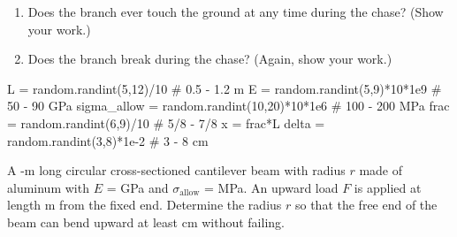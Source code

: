 \documentclass[
10pt,
a4paper,
openany,
svgnames,
]{kaobook} %
\begin{document}
\begin{exercises}
\begin{enumerate}
\item Does the branch ever touch the ground at any time during the chase? (Show your work.)
\item Does the branch break during the chase? (Again, show your work.)
\end{enumerate}

\begin{pycode}
  L = random.randint(5,12)/10 # 0.5 - 1.2 m
  E = random.randint(5,9)*10*1e9 # 50 - 90 GPa
  sigma_allow = random.randint(10,20)*10*1e6 # 100 - 200 MPa
  frac = random.randint(6,9)/10 # 5/8 - 7/8
  x = frac*L
  delta = random.randint(3,8)*1e-2 # 3 - 8 cm
\end{pycode}

  \item A -m long circular cross-sectioned cantilever beam with radius $r$ made of aluminum with $E$ =  GPa and $\sigma_{\text{allow}}$ =  MPa. An upward load $F$ is applied at length  m from the fixed end. Determine the radius $r$ so that the free end of the beam can bend upward at least  cm without failing.

  \begin{figure}[htbp]
    \centering
  \end{figure}
  
\end{exercises}

\end{document}
